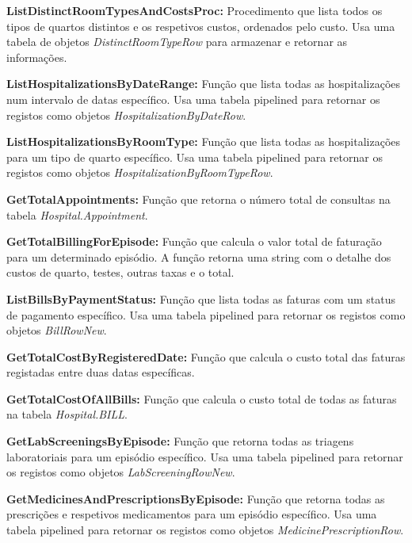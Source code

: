 \vspace{0.15cm}
\textbf{ListDistinctRoomTypesAndCostsProc:} Procedimento que lista todos os tipos de quartos distintos e os respetivos custos, ordenados pelo custo. Usa uma tabela de objetos \textit{DistinctRoomTypeRow} para armazenar e retornar as informações.

\vspace{0.15cm}
\textbf{ListHospitalizationsByDateRange:} Função que lista todas as hospitalizações num intervalo de datas específico. Usa uma tabela pipelined para retornar os registos como objetos \textit{HospitalizationByDateRow}.

\vspace{0.15cm}
\textbf{ListHospitalizationsByRoomType:} Função que lista todas as hospitalizações para um tipo de quarto específico. Usa uma tabela pipelined para retornar os registos como objetos \textit{HospitalizationByRoomTypeRow}.

\vspace{0.15cm}
\textbf{GetTotalAppointments:} Função que retorna o número total de consultas na tabela \textit{Hospital.Appointment}.

\vspace{0.15cm}
\textbf{GetTotalBillingForEpisode:} Função que calcula o valor total de faturação para um determinado episódio. A função retorna uma string com o detalhe dos custos de quarto, testes, outras taxas e o total.

\vspace{0.15cm}
\textbf{ListBillsByPaymentStatus:} Função que lista todas as faturas com um status de pagamento específico. Usa uma tabela pipelined para retornar os registos como objetos \textit{BillRowNew}.

\vspace{0.15cm}
\textbf{GetTotalCostByRegisteredDate:} Função que calcula o custo total das faturas registadas entre duas datas específicas.

\vspace{0.15cm}
\textbf{GetTotalCostOfAllBills:} Função que calcula o custo total de todas as faturas na tabela \textit{Hospital.BILL}.

\vspace{0.15cm}
\textbf{GetLabScreeningsByEpisode:} Função que retorna todas as triagens laboratoriais para um episódio específico. Usa uma tabela pipelined para retornar os registos como objetos \textit{LabScreeningRowNew}.

\vspace{0.15cm}
\textbf{GetMedicinesAndPrescriptionsByEpisode:} Função que retorna todas as prescrições e respetivos medicamentos para um episódio específico. Usa uma tabela pipelined para retornar os registos como objetos \textit{MedicinePrescriptionRow}.

